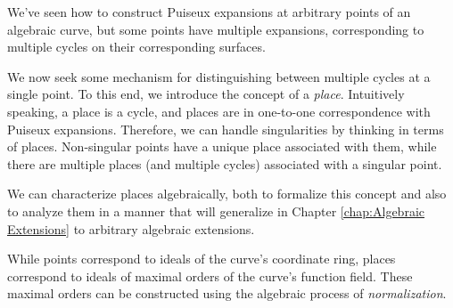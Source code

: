\begin{comment}
\begin{sageblock}
test_curves = [
    y^3 - 3*y + 2*x,
    y^3 + 3*y - x,
    y^3 - 3*y^2 - x,
    y^4 - 4*y - x,
    y^4+2*(1-2*x)*y^2+1,
    y^3-3*y^2+x^6,
    y^3-3*y+2*x^2*(2-x^2),
    y^3-3*y+2*x^3*(2-x^3),
    3*x*(x-1)*y^4 -4*(x-1)*(x-2)*y^3 + (4/27)*(x-2)^4,
    y^5 + (x^2-1)*y^4 - (4^4)/(5^5)*x^2*(x^2-1),
    y^3 - x*y - x^2,
    y^3 - 3*x^2*y + 2*x,
    y^3 - 3*x*y + 2*x^2,
    y^3 - 3*y + x^6];

# for f in test_curves:
#     analyze_multiple_points(f)
\end{sageblock}


$$y^3 - 3axy + x^3$$

This function contains an extra variable and is, in fact, a family of
algebraic curves.

\endexample

\end{comment}


\vfill\eject
{}

We've seen how to construct Puiseux expansions at arbitrary points of
an algebraic curve, but some points have multiple expansions,
corresponding to multiple cycles on their corresponding surfaces.

We now seek some mechanism for distinguishing between multiple cycles
at a single point.  To this end, we introduce the concept of a {\it
place}.  Intuitively speaking, a place is a cycle, and places are in
one-to-one correspondence with Puiseux expansions.  Therefore, we
can handle singularities by thinking in terms of places.
Non-singular points have a unique place associated
with them, while there are multiple places (and multiple cycles)
associated with a singular point.

We can characterize places algebraically, both to formalize this
concept and also to analyze them in a manner that will generalize
in Chapter \ref{chap:Algebraic Extensions} to arbitrary algebraic extensions.

While points correspond to ideals of the curve's coordinate ring,
places correspond to ideals of maximal orders of the curve's
function field.  These maximal orders can be constructed
using the algebraic process of {\it normalization}.

